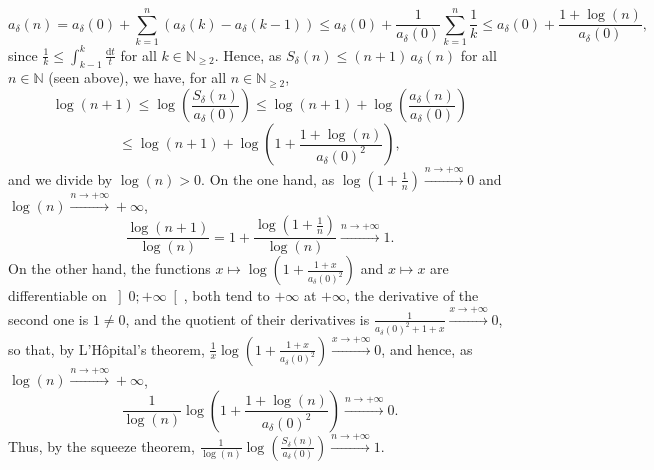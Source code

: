 \begin{solution}
    \begin{equation}
        a_\delta\left(n\right) = a_\delta\left(0\right)+\sum_{k=1}^{n} \left(a_\delta\left(k\right)-a_\delta\left(k-1\right)\right) \leq a_\delta\left(0\right)+\frac{1}{a_\delta\left(0\right)}\sum_{k=1}^{n} \frac{1}{k} \leq a_\delta\left(0\right)+\frac{1+\log\left(n\right)}{a_\delta\left(0\right)}, \label{eq:tel12-bound}
    \end{equation}
    since \( \frac{1}{k} \leq \int_{k-1}^{k} \frac{\mathrm{d}t}{t} \) for all \( k \in \mathbb{N}_{\geq 2} \). Hence, as \( S_\delta\left(n\right) \leq \left(n+1\right)\,a_\delta\left(n\right) \) for all \( n \in \mathbb{N} \) (seen above), we have, for all \( n \in \mathbb{N}_{\geq 2} \),
    \[
        \log\left(n+1\right) \leq \log\left(\frac{S_\delta\left(n\right)}{a_\delta\left(0\right)}\right) \leq \log\left(n+1\right)+\log\left(\frac{a_\delta\left(n\right)}{a_\delta\left(0\right)}\right)
    \]
    \[
        \leq \log\left(n+1\right)+\log\left(1+\frac{1+\log\left(n\right)}{a_\delta\left(0\right)^2}\right),
    \]
    and we divide by \( \log\left(n\right) > 0 \). On the one hand, as \( \log\left(1+\frac{1}{n}\right) \overset{n \to +\infty}{\longrightarrow} 0 \) and \( \log\left(n\right) \overset{n \to +\infty}{\longrightarrow} +\infty \),
    \[
        \frac{\log\left(n+1\right)}{\log\left(n\right)} = 1+\frac{\log\left(1+\frac{1}{n}\right)}{\log\left(n\right)} \overset{n \to +\infty}{\longrightarrow} 1.
    \]
    On the other hand, the functions \( x \mapsto \log\left(1+\frac{1+x}{a_\delta\left(0\right)^2}\right) \) and \( x \mapsto x \) are differentiable on \( \left]0;+\infty\right[ \), both tend to \( +\infty \) at \( +\infty \), the derivative of the second one is \( 1 \neq 0 \), and the quotient of their derivatives is \( \frac{1}{a_\delta\left(0\right)^2+1+x} \overset{x \to +\infty}{\longrightarrow} 0 \), so that, by L'Hôpital's theorem, \( \frac{1}{x}\log\left(1+\frac{1+x}{a_\delta\left(0\right)^2}\right) \overset{x \to +\infty}{\longrightarrow} 0 \), and hence, as \( \log\left(n\right) \overset{n \to +\infty}{\longrightarrow} +\infty \),
    \[
        \frac{1}{\log\left(n\right)}\log\left(1+\frac{1+\log\left(n\right)}{a_\delta\left(0\right)^2}\right) \overset{n \to +\infty}{\longrightarrow} 0.
    \]
    Thus, by the squeeze theorem, \( \frac{1}{\log\left(n\right)}\log\left(\frac{S_\delta\left(n\right)}{a_\delta\left(0\right)}\right) \overset{n \to +\infty}{\longrightarrow} 1 \).
    \\\\

\end{solution}

